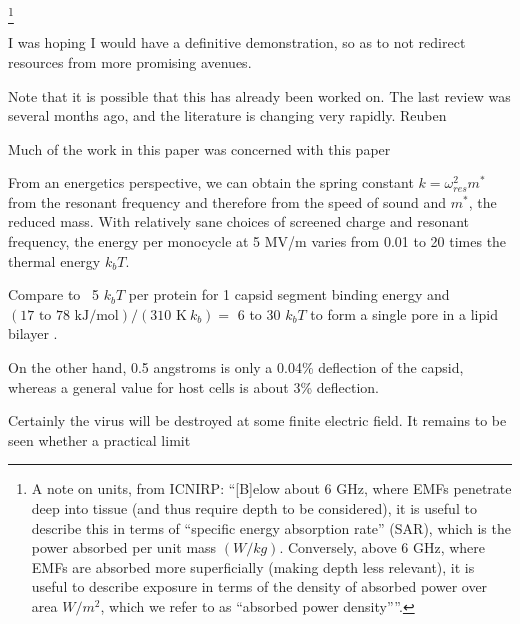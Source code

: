 \documentclass[paper.tex]{subfiles}
\begin{document}
\begin{multicols}{1}
\footnote{A note on units, from ICNIRP: ``{[B]elow about 6 GHz, where EMFs penetrate deep into tissue (and thus require depth to be considered), it is useful to describe this in terms of “specific energy absorption rate” (SAR), which is the power absorbed per unit mass $(W/kg)$. Conversely, above 6 GHz, where EMFs are absorbed more superficially (making depth less relevant), it is useful to describe exposure in terms of the density of absorbed power over area $W/m^2$, which we refer to as “absorbed power density”}''. }


I was hoping I would have a definitive demonstration, so as to not redirect resources from more promising avenues.


Note that it is possible that this has already been worked on. The last review was several months ago, and the literature is changing very rapidly. Reuben

Much of the work in this paper was concerned with this paper



From an energetics perspective, we can obtain the spring constant $k = \omega_{res}^2 m^*$ from the resonant frequency and therefore from the speed of sound and $m^*$, the reduced mass. With relatively sane choices of screened charge and resonant frequency, the energy per monocycle at 5 MV/m varies from 0.01 to 20 times the thermal energy $k_b T$. 

Compare to ~5 $k_b T$ per protein for 1 capsid segment binding energy \cite{Energies2012} \cite{Weak2002} and $ (\text{17 to 78 kJ/mol})  / (310 \text{ K}\ k_b) = $ 6 to 30 $k_b T$ to form a single pore in a lipid bilayer \cite{Atomistic2014a}.

On the other hand, 0.5 angstroms is only a 0.04\% deflection of the capsid, whereas a general value for host cells is about 3\% deflection. 

Certainly the virus will be destroyed at some finite electric field. It remains to be seen whether a practical limit 

 \cite{Resonance1996}





\end{multicols}
\end{document}
